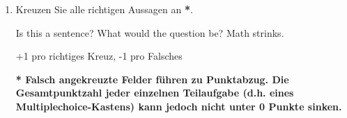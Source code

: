 
\begin{enumerate}[1)]
      \item Kreuzen Sie alle richtigen Aussagen an \textbf{*}.

      \begin{multiplechoice}
           {Is this a sentence?}
           {What would the question be?}
          {Math strinks.}
      \end{multiplechoice}

      \begin{loesung}
        +1 pro richtiges Kreuz, -1 pro Falsches
      \end{loesung}

    \vfill
      \noindent
      \small\textbf{* Falsch angekreuzte Felder führen zu Punktabzug. Die Gesamtpunktzahl jeder einzelnen Teilaufgabe (d.h. eines Multiplechoice-Kastens) kann jedoch nicht
       unter 0 Punkte sinken.}
    \clearpage

\end{enumerate}

\clearpage